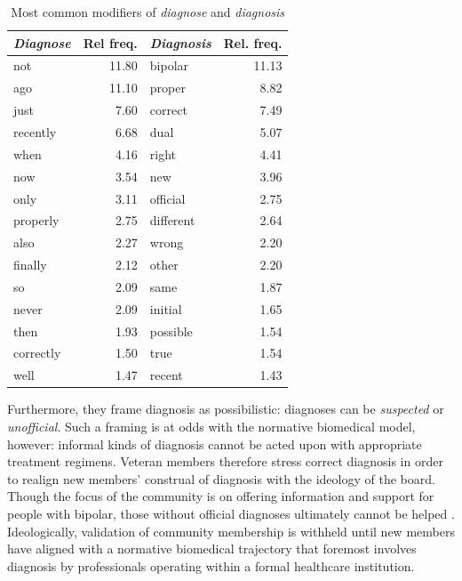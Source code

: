 \documentclass{article}
\renewcommand{\cite}{\parencite}
\begin{document}
\begin{table}[htb]
\begin{tabular}{lrlr}

\toprule
\emph{Diagnose}  & Rel freq.        & \emph{Diagnosis} & Rel. freq. \\
\midrule
not               &  11.80 & bipolar    &  11.13 \\
ago               &  11.10 & proper     &   8.82 \\
just              &   7.60 & correct    &   7.49 \\
recently          &   6.68 & dual       &   5.07 \\
when              &   4.16 & right      &   4.41 \\
now               &   3.54 & new        &   3.96 \\
only              &   3.11 & official   &   2.75 \\
properly          &   2.75 & different  &   2.64 \\
also              &   2.27 & wrong      &   2.20 \\
finally           &   2.12 & other      &   2.20 \\
so                &   2.09 & same       &   1.87 \\
never             &   2.09 & initial    &   1.65 \\
then              &   1.93 & possible   &   1.54 \\
correctly         &   1.50 & true       &   1.54 \\
well              &   1.47 & recent     &   1.43 \\
\bottomrule
\end{tabular}
\caption{Most common modifiers of \emph{diagnose} and \emph{diagnosis}}
\label{relfreq-diagnose-mods}
\end{table}

Furthermore, they frame diagnosis as possibilistic: diagnoses can be \emph{suspected} or \emph{unofficial}. Such a framing is at odds with the normative biomedical model, however: informal kinds of diagnosis cannot be acted upon with appropriate treatment regimens. Veteran members therefore stress correct diagnosis in order to realign new members' construal of diagnosis with the ideology of the board. Though the focus of the community is on offering information and support for people with bipolar, those without official diagnoses ultimately cannot be helped \cite{vayreda_social_2009}. Ideologically, validation of community membership is withheld until new members have aligned with a normative biomedical trajectory that foremost involves diagnosis by professionals operating within a formal healthcare institution.
\end{document}
